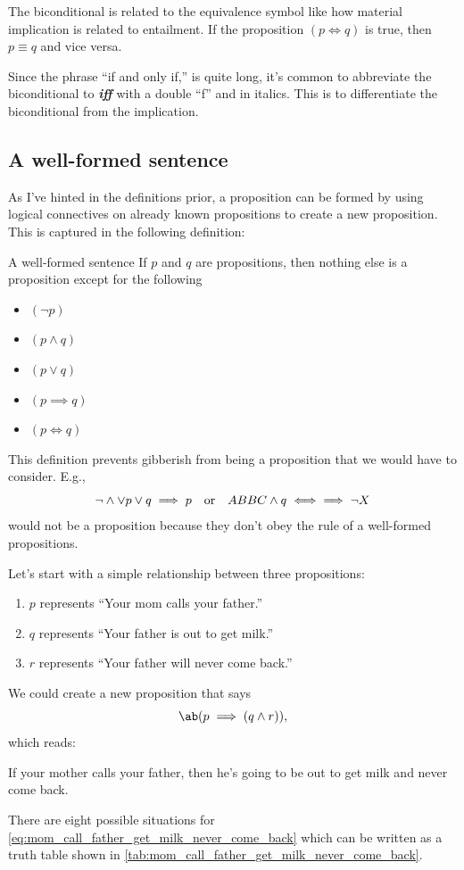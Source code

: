 The biconditional is related to the equivalence symbol like how material implication is related to entailment. If the proposition \((p \iff q)\) is true, then \(p \equiv q\) and vice versa.

Since the phrase \enquote{if and only if,} is quite long, it's common to abbreviate the biconditional to \emph{\textbf{iff}} with a double \enquote{f} and in italics. This is to differentiate the biconditional from the implication.

\subsection{A well-formed sentence}

As I've hinted in the definitions prior, a proposition can be formed by using logical connectives on already known propositions to create a new proposition. This is captured in the following definition:
\begin{df}{A well-formed sentence}{}
  If \(p\) and \(q\) are propositions, then nothing else is a proposition except for the following
  \begin{itemize}[noitemsep]
    \item \((\neg p)\)
    \item \((p \land q)\)
    \item \((p \lor q)\)
    \item \((p \implies q)\)
    \item \((p \iff q)\)
  \end{itemize}
\end{df}
This definition prevents gibberish from being a proposition that we would have to consider. E.g.,
\begin{equation}
  \neg \land \lor p \lor q \implies p \quad\textrm{or}\quad ABBC \land q \iff \implies \neg X
\end{equation}
would not be a proposition because they don't obey the rule of a well-formed propositions.

Let's start with a simple relationship between three propositions:
\begin{enumerate}[noitemsep]
  \item $p$ represents \enquote{Your mom calls your father.}
  \item $q$ represents \enquote{Your father is out to get milk.}
  \item $r$ represents \enquote{Your father will never come back.}
\end{enumerate}
We could create a new proposition that says
\begin{equation}
  \ab(p \implies (q \land r)), \label{eq:mom_call_father_get_milk_never_come_back}
\end{equation}
which reads:
\begin{displayquote}
  If your mother calls your father, then he's going to be out to get milk and never come back.
\end{displayquote}
There are eight possible situations for \cref{eq:mom_call_father_get_milk_never_come_back} which can be written as a truth table shown in \cref{tab:mom_call_father_get_milk_never_come_back}.


